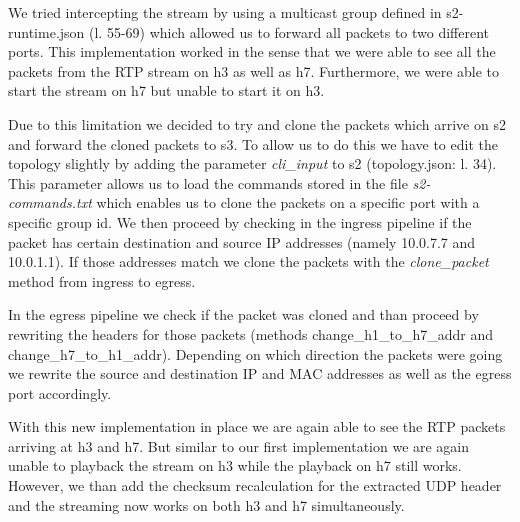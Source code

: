 \documentclass[a4paper,11pt]{article}
\begin{document}
We tried intercepting the stream by using a multicast group defined in s2-runtime.json (l. 55-69) which allowed us to forward all packets to two different ports.
This implementation worked in the sense that we were able to see all the packets from the RTP stream on h3 as well as h7.
Furthermore, we were able to start the stream on h7 but unable to start it on h3.

Due to this limitation we decided to try and clone the packets which arrive on s2 and forward the cloned packets to s3.
To allow us to do this we have to edit the topology slightly by adding the parameter \textit{cli\_input} to s2 (topology.json: l. 34).
This parameter allows us to load the commands stored in the file \textit{s2-commands.txt} which enables us to clone the packets on a specific port with a specific group id.
We then proceed by checking in the ingress pipeline if the packet has certain destination and source IP addresses (namely 10.0.7.7 and 10.0.1.1).
If those addresses match we clone the packets with the \textit{clone\_packet} method from ingress to egress.

In the egress pipeline we check if the packet was cloned and than proceed by rewriting the headers for those packets (methods change\_h1\_to\_h7\_addr and change\_h7\_to\_h1\_addr).
Depending on which direction the packets were going we rewrite the source and destination IP and MAC addresses as well as the egress port accordingly.

With this new implementation in place we are again able to see the RTP packets arriving at h3 and h7.
But similar to our first implementation we are again unable to playback the stream on h3 while the playback on h7 still works.
However, we than add the checksum recalculation for the extracted UDP header and the streaming now works on both h3 and h7 simultaneously.




\end{document}
